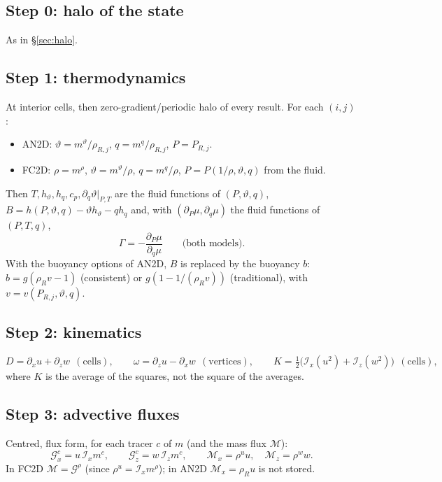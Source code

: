 \documentclass[11pt,a4paper]{article}
\newcommand{\vt}{\vartheta}                    %
\newcommand{\hth}{{h_{\vartheta}}}               %
\newcommand{\hq}{{h_q}}                          %
\newcommand{\Ix}{\mathcal{I}_x}
\newcommand{\Iz}{\mathcal{I}_z}
\begin{document}
\subsection{Step 0: halo of the state}
As in \S\ref{sec:halo}.

\subsection{Step 1: thermodynamics}
At interior cells, then zero-gradient/periodic halo of every result. For each $(i,j)$:
\begin{itemize}
  \item AN2D: $\vt=m^\vt/\rho_{R,j}$, $q=m^q/\rho_{R,j}$, $P=P_{R,j}$.
  \item FC2D: $\rho=m^\rho$, $\vt=m^\vt/\rho$, $q=m^q/\rho$, $P=P(1/\rho,\vt,q)$ from the fluid.
\end{itemize}
Then $T,\hth,\hq,c_p,\partial_q\vt|_{P,T}$ are the fluid functions of $(P,\vt,q)$, $B=h(P,\vt,q)-\vt\hth-q\hq$ and, with $(\partial_P\mu,\partial_q\mu)$ the fluid functions of $(P,T,q)$,
\begin{equation}
  \Gamma=-\frac{\partial_P\mu}{\partial_q\mu}\qquad\text{(both models).}
\end{equation}
With the buoyancy options of AN2D, $B$ is replaced by the buoyancy $b$: $b=g(\rho_Rv-1)$ (consistent) or $g(1-1/(\rho_Rv))$ (traditional), with $v=v(P_{R,j},\vt,q)$.

\subsection{Step 2: kinematics}
\begin{equation}
  D=\partial_xu+\partial_zw\ \ (\text{cells}),\qquad
  \omega=\partial_zu-\partial_xw\ \ (\text{vertices}),\qquad
  K=\tfrac12\big(\Ix(u^2)+\Iz(w^2)\big)\ \ (\text{cells}),
\end{equation}
where $K$ is the average of the squares, not the square of the averages.

\subsection{Step 3: advective fluxes}
Centred, flux form, for each tracer $c$ of $m$ (and the mass flux $\mathcal M$):
\begin{equation}
  \mathcal G^c_x=u\,\Ix m^c,\qquad \mathcal G^c_z=w\,\Iz m^c,\qquad
  \mathcal M_x=\rho^uu,\quad\mathcal M_z=\rho^ww .
\end{equation}
In FC2D $\mathcal M=\mathcal G^\rho$ (since $\rho^u=\Ix m^\rho$); in AN2D $\mathcal M_x=\rho_Ru$ is not stored.
\end{document}
